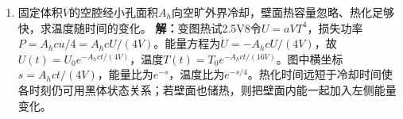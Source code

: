\documentclass[UTF8,fontset=fandol,a4paper,11pt]{ctexart}
\begin{document}
\begin{enumerate}
\item 固定体积$V$的空腔经小孔面积$A_h$向空旷外界冷却，壁面热容量忽略、热化足够快，求温度随时间的变化。
\textbf{解：}变图热试2.5V8令$U=aVT^4$，损失功率$P=A_hcu/4=A_hcU/(4V)$。能量方程为$\dot U=-A_hcU/(4V)$，故$U(t)=U_0e^{-A_hct/(4V)}$，温度$T(t)=T_0e^{-A_hct/(16V)}$。图中横坐标$s=A_hct/(4V)$，能量比为$e^{-s}$，温度比为$e^{-s/4}$。热化时间远短于冷却时间使各时刻仍可用黑体状态关系；若壁面也储热，则把壁面内能一起加入左侧能量变化。
\begin{center}\begin{minipage}{.98\linewidth}\centering
{}
\end{minipage}
\end{center}
\end{enumerate}
\end{document}
